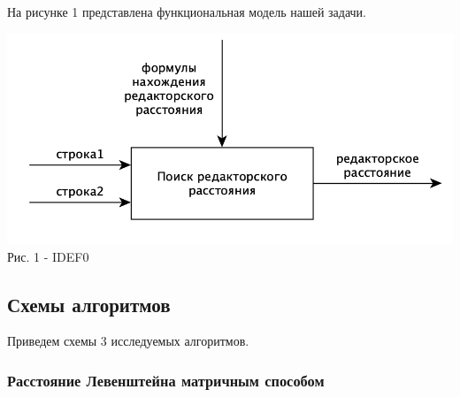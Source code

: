 \documentclass[a4paper,14pt]{article} %
\begin{document}
	На рисунке 1 представлена функциональная модель нашей задачи.  
	\begin{center}
		\includegraphics[scale = 0.8]{idef0} \\ Рис.  1 - IDEF0
	\end{center}
        
        \subsection{Схемы алгоритмов}
        Приведем схемы 3 исследуемых алгоритмов. 
        
        \subsubsection{Расстояние Левенштейна матричным способом}
        
\end{document}
